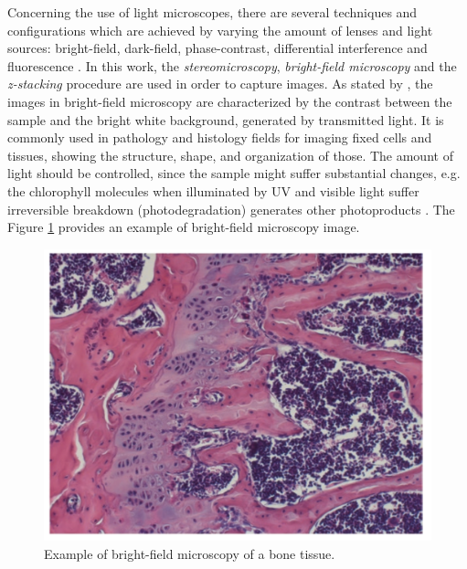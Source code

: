 Concerning the use of light microscopes, there are several techniques and configurations which are achieved by varying the amount of lenses and light sources: bright-field, dark-field, phase-contrast, differential interference and fluorescence \cite{roane2009microscopic}. In this work, the \emph{stereomicroscopy}, \emph{bright-field microscopy} and the \emph{z-stacking} procedure are used in order to capture images. As stated by , the images in bright-field microscopy are characterized by the contrast between the sample and the bright white background, generated by transmitted light. It is commonly used in pathology and histology fields for imaging fixed cells and tissues, showing the structure, shape, and organization of those. The amount of light should be controlled, since the sample might suffer substantial changes, e.g. the chlorophyll molecules when illuminated by UV and visible light suffer irreversible breakdown (photodegradation) generates other photoproducts \cite{petrovic2017clorophyll}. The Figure \ref{fig:bright-field_microscopy} provides an example of bright-field microscopy image.

\begin{figure}[htb]
	\centering
	\caption{\label{fig:bright-field_microscopy} Example of bright-field microscopy of a bone tissue.}
	\begin{center}
	    \includegraphics[scale=0.3]{images/bright-field_microscopy.png}
	\end{center}
	\centering
\end{figure}

